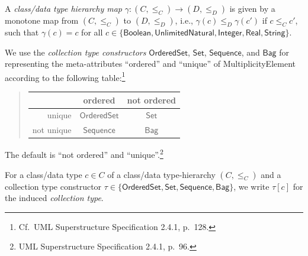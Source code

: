 \documentclass[10pt,fleqn,%
\ifpretendfinal
final%
\else
draft%
\fi,
]{scrreprt}
\newcommand{\uml}[1]{\textsf{#1}}
\begin{document}
A \emph{class/data type hierarchy map}
$\gamma : (C, {\leq_C}) \to (D, {\leq_D})$ is given by a monotone map
from $(C, {\leq_C})$ to $(D, {\leq_D})$, i.e.,
$\gamma(c) \leq_D \gamma(c')$ if $c \leq_C c'$, such that
$\gamma(c) = c$ for all
$c \in \{ \mathsf{Boolean}, \mathsf{UnlimitedNatural},\allowbreak
\mathsf{Integer}, \mathsf{Real}, \mathsf{String} \}$.

\medskip
We use the \emph{collection type constructors} $\mathsf{OrderedSet}$,
$\mathsf{Set}$, $\mathsf{Sequence}$, and $\mathsf{Bag}$ for
representing the meta-attributes ``ordered'' and ``unique'' of
\uml{MultiplicityElement} according to the following
table:\footnote{Cf.~UML Superstructure Specification 2.4.1, p.~128.}
%
\begin{quotation}
\begin{tabular}{@{}r||c|c@{}}
             & ordered               & not ordered\\
\hline\hline
  unique     & $\mathsf{OrderedSet}$ & $\mathsf{Set}$\\
\hline
  not unique & $\mathsf{Sequence}$   & $\mathsf{Bag}$
\end{tabular}
\end{quotation}
%
The default is ``not ordered'' and ``unique''.\footnote{UML
  Superstructure Specification 2.4.1, p.~96.}

For a class/data type $c \in C$ of a class/data type-hierarchy
$(C, {\leq_C})$ and a collection type constructor
$\tau \in \{ \mathsf{OrderedSet}, \mathsf{Set}, \mathsf{Sequence},
\mathsf{Bag} \}$,
we write $\tau[c]$ for the induced \emph{collection type}.
\end{document}
